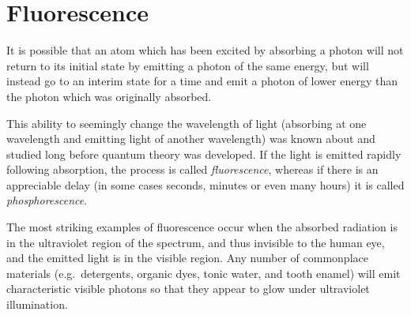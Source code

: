 
\section{Fluorescence}

It is possible that an atom which has been excited by absorbing a photon will not return to its initial state by emitting a photon of the same energy, but will instead go to an interim state for a time and emit a photon of lower energy than the photon which was originally absorbed.

This ability to seemingly change the wavelength of light (absorbing at one wavelength and emitting light of another wavelength) was known about and studied long before quantum theory was developed.  If the light is emitted rapidly following absorption, the process is called \emph{fluorescence}, whereas if there is an appreciable delay (in some cases seconds, minutes or even many hours) it is called \emph{phosphorescence}.

The most striking examples of fluorescence occur when the absorbed radiation is in the ultraviolet region of the spectrum, and thus invisible to the human eye, and the emitted light is in the visible region.  Any number of commonplace materials (e.g.\ detergents, organic dyes, tonic water, and tooth enamel) will emit characteristic visible photons so that they appear to glow under ultraviolet illumination.

